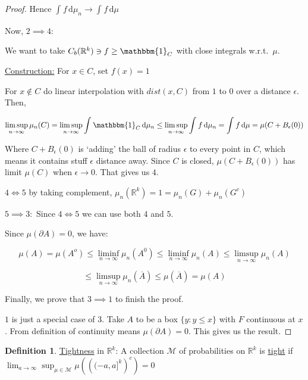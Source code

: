 \documentclass{article}
\theoremstyle{definition}
\newtheorem{definition}{Definition}
\begin{document}
\begin{proof}
    Hence \(\int_{}^{} f \,\mathrm{d}\mu_n \to \int_{}^{} f \,\mathrm{d}\mu \) 

    Now, \(2 \implies 4\):

    We want to take \(C_b(\mathbb{R}^k)\ni f \geq \mathbbm{1}_{C} \) with close integrals w.r.t.\ \(\mu \).
    
    \underline{Construction:} For \(x\in C\), set \(f(x) = 1\) 

    For \(x\notin C\) do linear interpolation with \(dist(x,C)\) from \(1\) to \(0\) over a distance \(\epsilon\). Then,

    \[
        \limsup_{n \to \infty} \mu_n(C) = \limsup_{n \to \infty} \int_{}^{} \mathbbm{1}_{C}  \,\mathrm{d}\mu_n \leq \limsup_{n \to \infty} \int_{}^{} f \,\mathrm{d}\mu_n = \int_{}^{} f \,\mathrm{d}\mu = \mu(C + B_{\epsilon}(0))
    \]

    Where \(C + B_{\epsilon} (0)\) is `adding' the ball of radius \(\epsilon\) to every point in \(C\), which means it contains stuff \(\epsilon\) distance away. Since \(C\) is closed, \(\mu(C+B_{\epsilon}(0))\) has limit \(\mu(C)\) when \(\epsilon \to 0\). That gives us \(4\).
    
    \(4 \iff 5\) by taking complement, \(\mu_n(\mathbb{R}^k) = 1 = \mu_n(G)+\mu_n(G^c)\) 

    \(5 \implies 3:\) Since \(4 \iff 5\) we can use both \(4\) and \(5\).

    Since \(\mu(\partial A) = 0\), we have:
    
    \[
        \mu(A) = \mu(A^o) \leq \liminf_{n \to \infty} \mu_n(A^0) \leq \liminf_{n \to \infty} \mu_n(A) \leq \limsup_{n \to \infty} \mu_n(A)
    \]
    
    \[
        \leq \limsup_{n \to \infty} \mu_n(\overline{A}) \leq \mu(\overline{A}) = \mu(A)
    \]

    Finally, we prove that \(3 \implies 1\) to finish the proof.

    \(1\) is just a special case of \(3\). Take \(A\) to be a box \(\{ y : y \leq x \} \) with \(F\) continuous at \(x\). From definition of continuity means \(\mu(\partial A) = 0\). This gives us the result.

\end{proof}

\begin{definition}
    \underline{Tightness} in \(\mathbb{R}^k\): A collection \(\mathcal{M}\) of probabilities on \(\mathbb{R}^k\) is \underline{tight} if \(\lim_{a \to \infty} \sup_{\mu\in \mathcal{M}}\mu \left( \left( (-a,a]^k \right)^c  \right) = 0 \) 
\end{definition}
\end{document}
